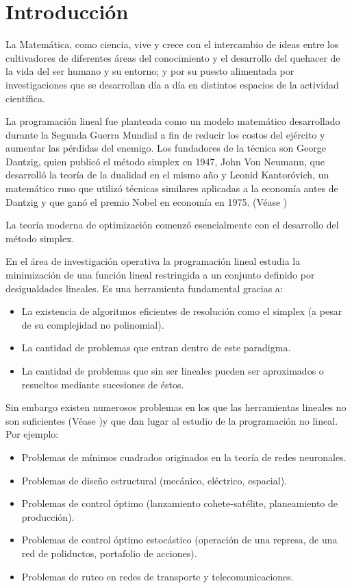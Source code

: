 \section{Introducción}

La Matem\'atica, como ciencia, vive y crece con el intercambio de ideas entre los cultivadores de
diferentes \'areas del conocimiento y el desarrollo del quehacer de la vida del ser humano y su
entorno; y por su puesto alimentada por investigaciones que se desarrollan d\'ia a d\'ia en 
distintos espacios de la actividad cient\'ifica.%

La programaci\'on lineal fue planteada como un modelo matem\'atico desarrollado durante la Segunda
Guerra Mundial a fin de reducir los costos del ej\'ercito y aumentar las p\'erdidas del enemigo. Los
fundadores de la t\'ecnica son George Dantzig, quien public\'o el método simplex en 1947, John Von
Neumann, que desarroll\'o la teor\'ia de la dualidad en el mismo año y Leonid Kantor\'ovich, un
matem\'atico ruso que utiliz\'o t\'ecnicas similares aplicadas a la econom\'ia antes de Dantzig y 
que gan\'o el premio Nobel en econom\'ia en 1975. (V\'ease \cite{intro})

La teor\'ia moderna de optimizaci\'on comenz\'o esencialmente con el desarrollo del m\'etodo simplex. 

En el \'area de investigaci\'on operativa la programaci\'on lineal estudia la minimizaci\'on de una 
funci\'on lineal restringida a un conjunto definido por desigualdades lineales. Es una herramienta fundamental
gracias a:

\begin{itemize}
   \item La existencia de algoritmos eficientes de resoluci\'on como el simplex (a pesar de su 
	 complejidad no polinomial).
   \item La cantidad de problemas que entran dentro de este paradigma.
   \item La cantidad de problemas que sin ser lineales pueden ser aproximados o resueltos 
	 mediante sucesiones de \'estos.
\end{itemize}

Sin embargo existen numerosos problemas en los que las herramientas lineales no son suficientes (V\'ease \cite{orden})y 
que dan lugar al estudio de la programaci\'on no lineal. Por ejemplo:

\begin{itemize}
   \item Problemas de m\'inimos cuadrados originados en la teor\'ia de redes neuronales.
   \item Problemas de diseño estructural (mec\'anico, el\'ectrico, espacial).
   \item Problemas de control \'optimo (lanzamiento cohete-sat\'elite, planeamiento de producci\'on).
   \item Problemas de control óptimo estoc\'astico (operaci\'on de una represa, de una red de 
	 poliductos, portafolio de acciones).
   \item Problemas de ruteo en redes de transporte y telecomunicaciones.
\end{itemize}

